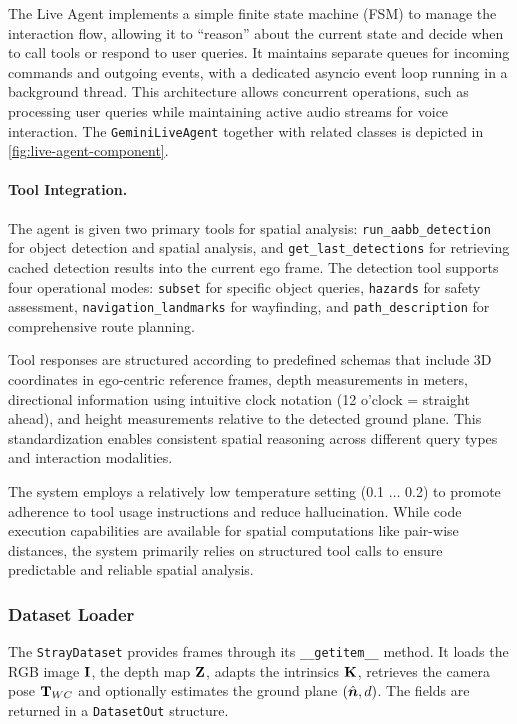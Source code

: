 The Live Agent implements a simple finite state machine (FSM) to manage the interaction flow, allowing it to ``reason'' about the current state and decide when to call tools or respond to user queries.
It maintains separate queues for incoming commands and outgoing events, with a dedicated asyncio event loop running in a background thread. This architecture allows concurrent operations, such as processing user queries while maintaining active audio streams for voice interaction. The \texttt{GeminiLiveAgent} together with related classes is depicted in \autoref{fig:live-agent-component}.

\paragraph{Tool Integration.}

The agent is given two primary tools for spatial analysis: \texttt{run\_aabb\_detection} for object detection and spatial analysis, and \texttt{get\_last\_detections} for retrieving cached detection results into the current ego frame. The detection tool supports four operational modes: \texttt{subset} for specific object queries, \texttt{hazards} for safety assessment, \texttt{navigation\_landmarks} for wayfinding, and \texttt{path\_description} for comprehensive route planning.

Tool responses are structured according to predefined schemas that include 3D coordinates in ego-centric reference frames, depth measurements in meters, directional information using intuitive clock notation (12 o'clock = straight ahead), and height measurements relative to the detected ground plane. This standardization enables consistent spatial reasoning across different query types and interaction modalities.

The system employs a relatively low temperature setting (0.1 \( \dots \) 0.2) to promote adherence to tool usage instructions and reduce hallucination. While code execution capabilities are available for spatial computations like pair-wise distances, the system primarily relies on structured tool calls to ensure predictable and reliable spatial analysis.


\subsubsection{Dataset Loader}
The \texttt{StrayDataset} provides frames through its \texttt{\_{}\_{}getitem\_{}\_} method. It loads the RGB image \(\mathbf{I}\), the depth map \(\mathbf{Z}\), adapts the intrinsics \(\mathbf{K}\), retrieves the camera pose \(\mathbf{T}_{WC}\) and optionally estimates the ground plane \((\hat{\boldsymbol{n}},d)\). The fields are returned in a \texttt{DatasetOut} structure.

